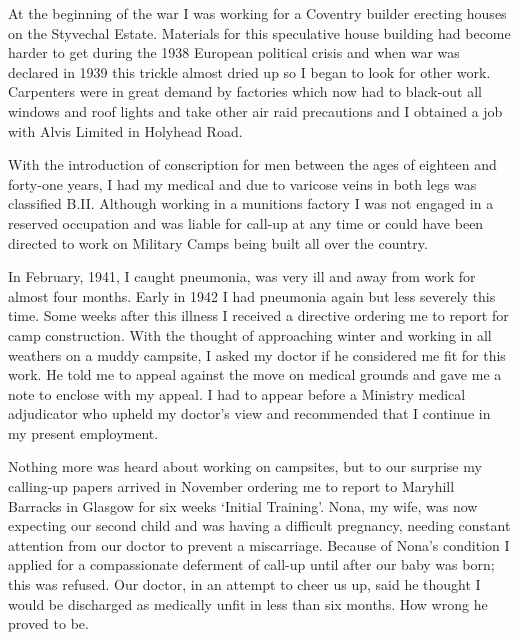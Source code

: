 At the beginning of the war I was working for a Coventry builder
erecting houses on the Styvechal Estate. Materials for this
speculative house building had become harder to get during the 1938
European political crisis and when war was declared in 1939 this
trickle almost dried up so I began to look for other work. Carpenters
were in great demand by factories which now had to black-out all
windows and roof lights and take other air raid precautions and I
obtained a job with Alvis Limited in Holyhead Road.

With the introduction of conscription for men between the ages of
eighteen and forty-one years, I had my medical and due to varicose
veins in both legs was classified B.II. Although working in a
munitions factory I was not engaged in a reserved occupation and was
liable for call-up at any time or could have been directed to work on
Military Camps being built all over the country.

In February, 1941, I caught pneumonia, was very ill and away from work
for almost four months. Early in 1942 I had pneumonia again but less
severely this time. Some weeks after this illness I received a
directive ordering me to report for camp construction. With the
thought of approaching winter and working in all weathers on a muddy
campsite, I asked my doctor if he considered me fit for this work. He
told me to appeal against the move on medical grounds and gave me a
note to enclose with my appeal. I had to appear before a Ministry
medical adjudicator who upheld my doctor's view and recommended that I
continue in my present employment.

Nothing more was heard about working on campsites, but to our surprise
my calling-up papers arrived in November ordering me to report to
Maryhill Barracks in Glasgow for six weeks `Initial Training'. Nona, my
wife, was now expecting our second child and was having a difficult
pregnancy, needing constant attention from our doctor to prevent a
miscarriage. Because of Nona's condition I applied for a
compassionate deferment of call-up until after our baby was born; this
was refused. Our doctor, in an attempt to cheer us up, said he
thought I would be discharged as medically unfit in less than six
months. How wrong he proved to be.

